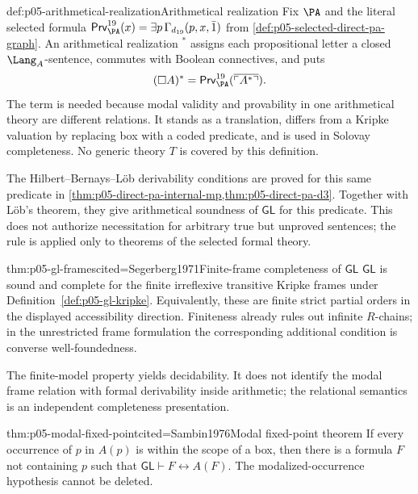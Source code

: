 \begin{hbdefinition}{def:p05-arithmetical-realization}{Arithmetical realization}
Fix \(\PA\) and the literal selected formula
\(\mathsf{Prv}^{19}_{\PA}(x)=\exists p\,\Gamma_{d_{19}}(p,x,\bar1)\)
from \cref{def:p05-selected-direct-pa-graph}. An arithmetical
realization \(^*\) assigns each propositional letter a closed
\(\Lang_A\)-sentence, commutes with Boolean connectives, and puts
\[
 (\Box A)^*=\mathsf{Prv}^{19}_{\PA}
   (\overline{\ulcorner A^*\urcorner}).
\]
The term is needed because modal validity and provability in one arithmetical
theory are different relations.  It stands as a translation, differs from a
Kripke valuation by replacing box with a coded predicate, and is used in
Solovay completeness.  No generic theory \(T\) is covered by this definition.
\end{hbdefinition}

The Hilbert--Bernays--L\"ob derivability conditions are proved for this
same predicate in
\cref{thm:p05-direct-pa-internal-mp,thm:p05-direct-pa-d3}. Together with
L\"ob's theorem, they give arithmetical soundness of \(\mathsf{GL}\)
for this predicate.
This does not authorize
necessitation for arbitrary true but unproved sentences; the rule is applied
only to theorems of the selected formal theory.

\begin{hbtheorem}{thm:p05-gl-frames}{cited=Segerberg1971}{Finite-frame completeness of \(\mathsf{GL}\)}
\(\mathsf{GL}\) is sound and complete for the finite irreflexive transitive
Kripke frames under Definition~\ref{def:p05-gl-kripke}.  Equivalently, these
are finite strict partial orders in the displayed accessibility direction.
Finiteness already rules out infinite \(R\)-chains; in the unrestricted frame
formulation the corresponding additional condition is converse
well-foundedness.
\end{hbtheorem}

The finite-model property yields decidability.  It does not identify the modal
frame relation with formal derivability inside arithmetic; the relational
semantics is an independent completeness presentation.

\begin{hbtheorem}{thm:p05-modal-fixed-point}{cited=Sambin1976}{Modal fixed-point theorem}
If every occurrence of \(p\) in \(A(p)\) is within the scope of a box, then
there is a formula \(F\) not containing \(p\) such that
\(\mathsf{GL}\vdash F\leftrightarrow A(F)\).  The modalized-occurrence
hypothesis cannot be deleted.
\end{hbtheorem}

